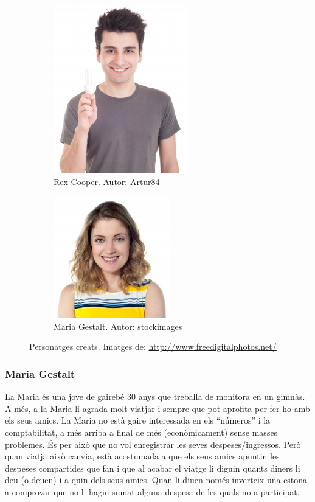 \begin{figure}
	\centering
	\begin{subfigure}[b]{0.5\textwidth}
		\centering
		\includegraphics[scale=0.4]{Rex_cooper.jpg}
		\caption{Rex Cooper. Autor: Artur84}
		\label{fig:rex_cooper}
	\end{subfigure}
	\quad
	\begin{subfigure}[b]{0.5\textwidth}
		\centering
		\includegraphics[scale=0.5]{Maria_gestalt.jpg}
		\caption{Maria Gestalt. Autor: stockimages}
		\label{fig:maria_gestalt}
	\end{subfigure}

\caption{Personatges creats. Imatges de: \url{http://www.freedigitalphotos.net/}}\label{fig:personas}
\end{figure}


\subsubsection{Maria Gestalt}

La Maria és una jove de gairebé 30 anys que treballa de monitora en un gimnàs. A més, a la Maria li agrada molt viatjar i sempre que pot aprofita per fer-ho amb els seus amics.
La Maria no està gaire interessada en els “números” i la comptabilitat, a més arriba a final de més (econòmicament) sense masses problemes. És per això que no vol enregistrar les seves despeses/ingressos. Però quan viatja això canvia, està acostumada a que els seus amics apuntin les despeses compartides que fan i que al acabar el viatge li diguin quants diners li deu (o deuen) i a quin dels seus amics. Quan li diuen només inverteix una estona a comprovar que no li hagin sumat alguna despesa de les quals no a participat. 


